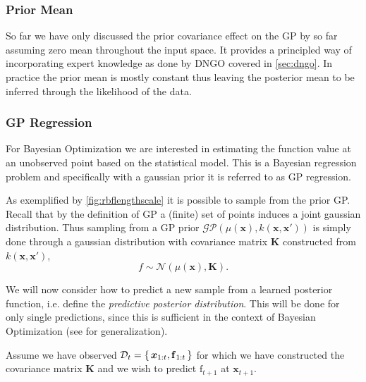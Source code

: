 \documentclass[conference,compsoc]{IEEEtran}
\theoremstyle{definition}
\begin{document}
        \subsubsection{Prior Mean}\label{sec:priormean}

            So far we have only discussed the prior covariance effect on the GP by so far assuming zero mean throughout the input space.
            It provides a principled way of incorporating expert knowledge as done by DNGO covered in \cref{sec:dngo}.
            In practice the prior mean is mostly constant thus leaving the posterior mean to be inferred through the likelihood of the data.

        \subsubsection{GP Regression}\label{sec:gpreg}
      
            For Bayesian Optimization we are interested in estimating the function value at an unobserved point based on the statistical model.
            This is a Bayesian regression problem and specifically with a gaussian prior it is referred to as GP regression.

            As exemplified by \cref{fig:rbflengthscale} it is possible to sample from the prior GP.
            Recall that by the definition of GP a (finite) set of points induces a joint gaussian distribution.
            Thus sampling from a GP prior $\mathcal{GP}(\mu(\bm{x}), k(\bm{x},\bm{x}'))$ is simply done through a gaussian distribution with covariance matrix $\bm{K}$ constructed from $k(\bm{x},\bm{x}')$,
            \begin{equation}
                f \sim \mathcal{N}(\mu(\bm{x}), \bm{K}).
            \end{equation}
        
            We will now consider how to predict a new sample from a learned posterior function, i.e. define the \emph{predictive posterior distribution}.
            This will be done for only single predictions, since this is sufficient in the context of Bayesian Optimization (see \parencite{rasmussen_gaussian_2006} for generalization).

            Assume we have observed $\mathcal{D}_t = \set{\bm{x}_{1:t},\bm{\mathrm{f}}_{1:t}}$ for which we have constructed the covariance matrix $\bm{K}$ and we wish to predict $\mathrm{f}_{t+1}$ at $\bm{x}_{t+1}$.
\end{document}
